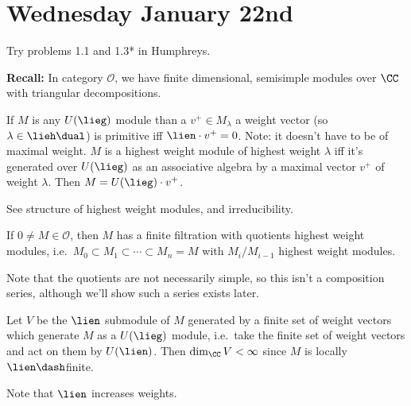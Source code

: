 \hypertarget{wednesday-january-22nd}{%
\section{Wednesday January 22nd}\label{wednesday-january-22nd}}

\begin{exercise}[?]

Try problems 1.1 and 1.3* in Humphreys.

\end{exercise}

\textbf{Recall:} In category \(\mathcal O\), we have finite dimensional,
semisimple modules over \(\CC\) with triangular decompositions.

If \(M\) is any \(U(\lieg)\) module than a \(v^+ \in M_\lambda\) a
weight vector (so \(\lambda \in \lieh\dual\)) is primitive iff
\(\lien \cdot v^+ = 0\). Note: it doesn't have to be of maximal weight.
\(M\) is a highest weight module of highest weight \(\lambda\) iff it's
generated over \(U(\lieg)\) as an associative algebra by a maximal
vector \(v^+\) of weight \(\lambda\). Then \(M = U(\lieg) \cdot v^+\).

See structure of highest weight modules, and irreducibility.

\begin{corollary}[?]

If \(0 \neq M\in\mathcal O\), then \(M\) has a finite filtration with
quotients highest weight modules,
i.e.~\(M_0 \subset M_1 \subset \cdots \subset M_n = M\) with
\(M_i/M_{i-1}\) highest weight modules.

\end{corollary}

Note that the quotients are not necessarily simple, so this isn't a
composition series, although we'll show such a series exists later.

\begin{theorem}

Let \(V\) be the \(\lien\) submodule of \(M\) generated by a finite set
of weight vectors which generate \(M\) as a \(U(\lieg)\) module,
i.e.~take the finite set of weight vectors and act on them by
\(U(\lien)\). Then \(\dim_\CC V < \infty\) since \(M\) is locally
\(\lien\dash\)finite.

\end{theorem}

Note that \(\lien\) increases weights.

